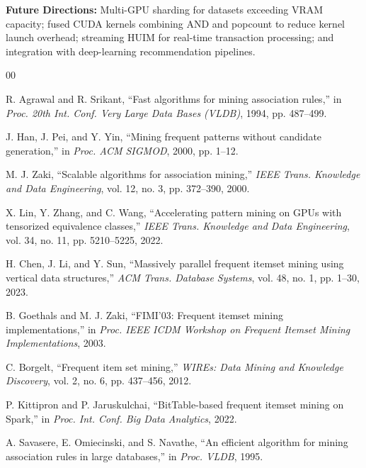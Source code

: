 \documentclass[conference]{IEEEtran}
\begin{document}
\textbf{Future Directions:} Multi-GPU sharding for datasets exceeding VRAM capacity; fused CUDA kernels combining AND and popcount to reduce kernel launch overhead; streaming HUIM for real-time transaction processing; and integration with deep-learning recommendation pipelines.


\begin{thebibliography}{00}

R. Agrawal and R. Srikant, ``Fast algorithms for mining association rules,'' in \textit{Proc. 20th Int. Conf. Very Large Data Bases (VLDB)}, 1994, pp. 487--499.

J. Han, J. Pei, and Y. Yin, ``Mining frequent patterns without candidate generation,'' in \textit{Proc. ACM SIGMOD}, 2000, pp. 1--12.

M. J. Zaki, ``Scalable algorithms for association mining,'' \textit{IEEE Trans. Knowledge and Data Engineering}, vol. 12, no. 3, pp. 372--390, 2000.

X. Lin, Y. Zhang, and C. Wang, ``Accelerating pattern mining on GPUs with tensorized equivalence classes,'' \textit{IEEE Trans. Knowledge and Data Engineering}, vol. 34, no. 11, pp. 5210--5225, 2022.

H. Chen, J. Li, and Y. Sun, ``Massively parallel frequent itemset mining using vertical data structures,'' \textit{ACM Trans. Database Systems}, vol. 48, no. 1, pp. 1--30, 2023.

B. Goethals and M. J. Zaki, ``FIMI'03: Frequent itemset mining implementations,'' in \textit{Proc. IEEE ICDM Workshop on Frequent Itemset Mining Implementations}, 2003.

C. Borgelt, ``Frequent item set mining,'' \textit{WIREs: Data Mining and Knowledge Discovery}, vol. 2, no. 6, pp. 437--456, 2012.

P. Kittipron and P. Jaruskulchai, ``BitTable-based frequent itemset mining on Spark,'' in \textit{Proc. Int. Conf. Big Data Analytics}, 2022.

A. Savasere, E. Omiecinski, and S. Navathe, ``An efficient algorithm for mining association rules in large databases,'' in \textit{Proc. VLDB}, 1995.


\end{thebibliography}
\end{document}
